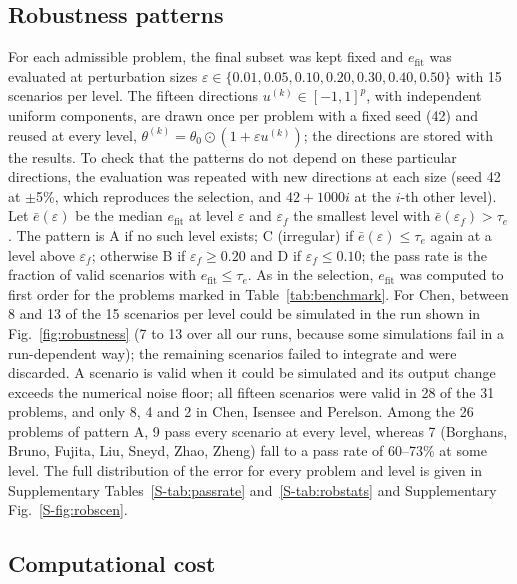 \documentclass[pdflatex,sn-nature]{sn-jnl}
\theoremstyle{plain}
\begin{document}
\subsection*{Robustness patterns}\label{met:robust}

For each admissible problem, the final subset was kept fixed and $e_{\mathrm{fit}}$ was evaluated at perturbation sizes $\varepsilon\in\{0.01,0.05,0.10,0.20,0.30,0.40,0.50\}$ with 15 scenarios per level. The fifteen directions $u^{(k)}\in[-1,1]^p$, with independent uniform components, are drawn once per problem with a fixed seed (42) and reused at every level, $\theta^{(k)}=\theta_0\odot(1+\varepsilon u^{(k)})$; the directions are stored with the results. To check that the patterns do not depend on these particular directions, the evaluation was repeated with new directions at each size (seed 42 at $\pm$5\%, which reproduces the selection, and $42+1000i$ at the $i$-th other level). Let $\bar e(\varepsilon)$ be the median $e_{\mathrm{fit}}$ at level $\varepsilon$ and $\varepsilon_f$ the smallest level with $\bar e(\varepsilon_f)>\tau_e$. The pattern is A if no such level exists; C (irregular) if $\bar e(\varepsilon)\le\tau_e$ again at a level above $\varepsilon_f$; otherwise B if $\varepsilon_f\ge0.20$ and D if $\varepsilon_f\le0.10$; the pass rate is the fraction of valid scenarios with $e_{\mathrm{fit}}\le\tau_e$. As in the selection, $e_{\mathrm{fit}}$ was computed to first order for the problems marked in Table~\ref{tab:benchmark}. For Chen, between 8 and 13 of the 15 scenarios per level could be simulated in the run shown in Fig.~\ref{fig:robustness} (7 to 13 over all our runs, because some simulations fail in a run-dependent way); the remaining scenarios failed to integrate and were discarded. A scenario is valid when it could be simulated and its output change exceeds the numerical noise floor; all fifteen scenarios were valid in 28 of the 31 problems, and only 8, 4 and 2 in Chen, Isensee and Perelson. Among the 26 problems of pattern A, 9 pass every scenario at every level, whereas 7 (Borghans, Bruno, Fujita, Liu, Sneyd, Zhao, Zheng) fall to a pass rate of 60--73\% at some level. The full distribution of the error for every problem and level is given in Supplementary Tables~\ref{S-tab:passrate} and~\ref{S-tab:robstats} and Supplementary Fig.~\ref{S-fig:robscen}.

\subsection*{Computational cost}\label{met:cost}
\end{document}
